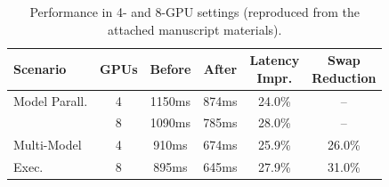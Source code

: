 
\begin{table}[t]
\caption{Performance in 4- and 8-GPU settings (reproduced from the attached manuscript materials).}
\label{tab:multi_gpu}
\centering
\begin{tabular}{|l|c|c|c|c|c|}
\hline
Scenario & GPUs & Before & After & \makecell{Latency\\Impr.} & \makecell{Swap\\Reduction} \\
\hline
Model Parall. & 4 & 1150ms & 874ms & 24.0\% & -- \\
              & 8 & 1090ms & 785ms & 28.0\% & -- \\
\hline
Multi-Model   & 4 & 910ms  & 674ms & 25.9\% & 26.0\% \\
Exec.         & 8 & 895ms  & 645ms & 27.9\% & 31.0\% \\
\hline
\end{tabular}
\end{table}
